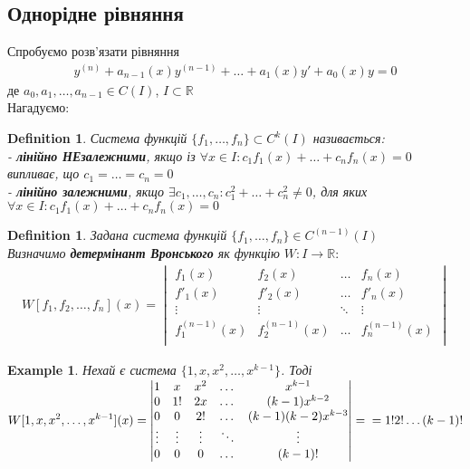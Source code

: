 \documentclass[a4paper, 10pt]{article}
\theoremstyle{theoremdd}
\theoremstyle{theoremdd}
\newtheorem{definition}[theorem]{Definition}
\theoremstyle{theoremdd}
\theoremstyle{theoremdd}
\newtheorem{example}[theorem]{Example}
\theoremstyle{theoremdd}
\theoremstyle{theoremdd}
\theoremstyle{theoremdd}
\theoremstyle{theoremdd}
\begin{document}
	\subsection{Однорідне рівняння}
	Спробуємо розв'язати рівняння
	\begin{align*}
	y^{(n)} + a_{n-1}(x)y^{(n-1)}+\dots+a_1(x)y'+a_0(x)y = 0
	\end{align*}
	де $a_0, a_1,\dots,a_{n-1}\in C(I)$, $I \subset \mathbb{R}$\\
	Нагадуємо:\\
	\begin{definition}
 Система функцій $\{f_1,\dots,f_n\} \subset C^k(I)$ називається:\\
	- \textbf{лінійно НЕзалежними}, якщо із $\forall x \in I: c_1f_1(x) + \dots + c_n f_n(x) = 0$ випливає, що $c_1 = \dots = c_n = 0$\\
	- \textbf{лінійно залежними}, якщо $\exists c_1, \dots, c_n: c_1^2 + \dots + c_n^2 \neq 0$, для яких $\forall x \in I: c_1f_1(x) + \dots + c_n f_n(x) = 0$
	\end{definition}
	
	\begin{definition}
 Задана система функцій $\{f_1, \dots, f_n\} \in C^{(n-1)}(I)$\\
	Визначимо \textbf{детермінант Вронського} як функцію $W: I \rightarrow \mathbb{R}:$
	\begin{align*}
W[f_1,f_2,\dots,f_n](x) = 
\begin{vmatrix} 
	f_1(x) &  f_2(x) & \dots & f_n(x) \\ 
	f'_1(x) &  f'_2(x) & \dots & f'_n(x) \\
	\vdots &  \vdots & \ddots & \vdots \\
	f^{(n-1)}_1(x) &  f^{(n-1)}_2(x) & \dots & f^{(n-1)}_n(x) \\ 
\end{vmatrix}
	\end{align*}
	\end{definition}
	
	\begin{example}
 Нехай є система $\{1,x,x^2,\dots,x^{k-1}\}$. Тоді\\
	$\displaystyle W[1,x,x^2,\dots,x^{k-1}](x) = 
	\begin{vmatrix} 
	1 &  x & x^2 & \dots & x^{k-1} \\ 
	0 &  1! & 2x & \dots & (k-1)x^{k-2} \\ 
	0 &  0 & 2! & \dots & (k-1)(k-2)x^{k-3} \\
	\vdots & \vdots & \vdots & \ddots & \vdots \\
	0 &  0 & 0 & \dots & (k-1)! \\
\end{vmatrix} = \\ = 1! 2! \dots (k-1)!$
	\end{example}
	
\end{document}
